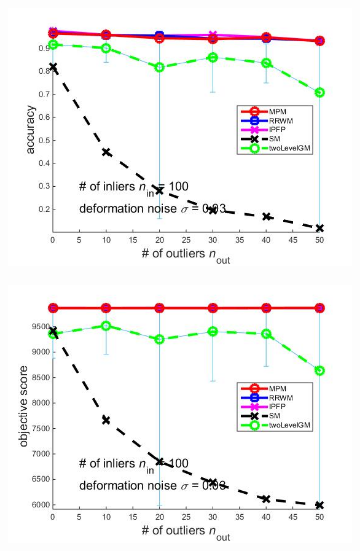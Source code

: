 \documentclass[
	fontsize=12pt,
	paper=a4,
	twoside=false,
	numbers=noenddot,
	plainheadsepline,
	toc=listof,
	toc=bibliography
]{scrartcl}
\begin{document}
\begin{figure}[h] 
	\begin{subfigure}[b]{0.3\textwidth}
		\centering
		\includegraphics[scale=0.25]{"fig_ver2608/syntheticPointSets/ver4.3.1/outliertest_n50/accuracy_avg10t"} 
	\end{subfigure}%
	\begin{subfigure}[b]{0.3\textwidth}
		\centering
		\includegraphics[scale=0.25]{"fig_ver2608/syntheticPointSets/ver4.3.1/outliertest_n50/score_avg10t"} 
	\end{subfigure} 
	\begin{subfigure}[b]{0.3\textwidth}
		\centering

\end{subfigure}
\end{figure}
\end{document}
